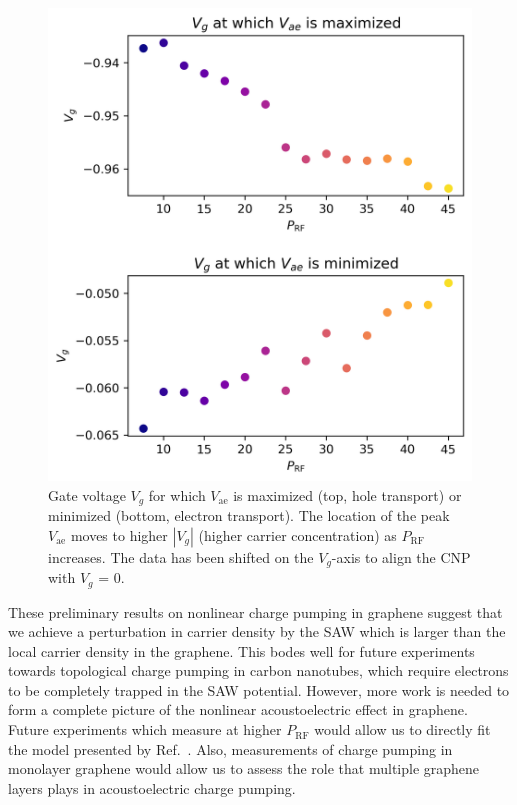 \documentclass[double,12pt,1in,seploa]{beavtex}
\begin{document}
\begin{figure}
    \includegraphics{Vg at which vae is max or min.png}
    \caption{Gate voltage $V_g$ for which $V_{\mathrm{ae}}$ is maximized (top, hole transport) or minimized (bottom, electron transport). The location of the peak $V_{\mathrm{ae}}$ moves to higher $|V_g|$ (higher carrier concentration) as $P_{\mathrm{RF}}$ increases. The data has been shifted on the $V_g$-axis to align the CNP with $V_g$ = 0.}
    \label{Vg at which vae is max or min}
\end{figure}


These preliminary results on nonlinear charge pumping in graphene suggest that we achieve a perturbation in carrier density by the SAW which is larger than the local carrier density in the graphene. This bodes well for future experiments towards topological charge pumping in carbon nanotubes, which require electrons to be completely trapped in the SAW potential. However, more work is needed to form a complete picture of the nonlinear acoustoelectric effect in graphene. Future experiments which measure at higher $P_{\mathrm{RF}}$ would allow us to directly fit the model presented by Ref.\ \cite{rotter_nonlinear_1999}. Also, measurements of charge pumping in monolayer graphene would allow us to assess the role that multiple graphene layers plays in acoustoelectric charge pumping. 
\end{document}
